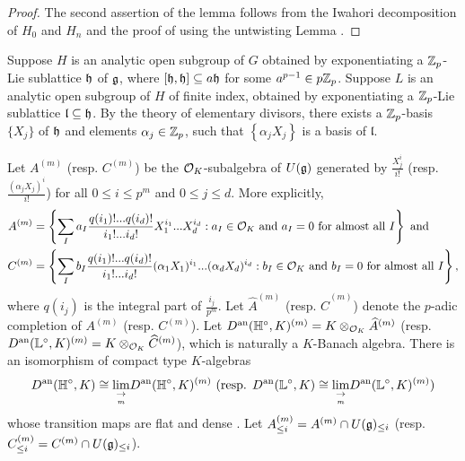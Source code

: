\documentclass[10pt]{amsart}
\begin{document}
\begin{proof}
The second assertion of the lemma follows from the Iwahori decomposition of $H_{0}$ and $H_{n}$ and the proof of \cite[Prop. 4.2.22]{Jacquet1} using the untwisting Lemma \cite[Lem. 3.6.4]{analytic}. 
\end{proof}

Suppose $H$ is an analytic open subgroup of $G$ obtained by exponentiating a $\mathbb{Z}_{p}$-Lie sublattice $\mathfrak{h}$ of $\mathfrak{g}$, where $\left[\mathfrak{h},\mathfrak{h}\right]\subseteq a\mathfrak{h}$ for some $a^{p-1}\in p\mathbb{Z}_{p}$. Suppose $L$ is an analytic open subgroup of $H$ of finite index, obtained by exponentiating a $\mathbb{Z}_{p}$-Lie sublattice $\mathfrak{l}\subseteq\mathfrak{h}$. By the theory of elementary divisors, there exists a $\mathbb{Z}_{p}$-basis $\{X_{j}\}$ of $\mathfrak{h}$ and elements $\alpha_{j}\in \mathbb{Z}_{p}$, such that $\left\{ \alpha_{j}X_{j}\right\}$  is a basis of $\mathfrak{l}$. 

Let $A^{(m)}$ (resp. $C^{(m)}$) be the $\mathcal{O}_{K}$-subalgebra of $U(\mathfrak{g})$ generated by $\frac{X_{j}^{i}}{i!}$ (resp. $\frac{(\alpha_{j}X_{j})^{i}}{i!}$) for all $0\leq i\leq p^{m}$ and $0\leq j \leq d$. More explicitly,  \begin{equation}\label{eqn:A^(m)}
    \begin{split}
        A^{(m)}& = \left\{ \sum_{I} a_{I} \frac{q(i_{1})!...q(i_{d})!}{i_{1}!...i_{d}!}X_{1}^{i_{1}}...X_{d}^{i_{d}}: a_{I}\in \mathcal{O}_{K} \textnormal{ and } a_{I}=0\textnormal{ for almost all }I\right\} \textnormal{ and}\\
        C^{(m)}& = \left\{ \sum_{I} b_{I} \frac{q(i_{1})!...q(i_{d})!}{i_{1}!...i_{d}!}(\alpha_{1}X_{1})^{i_{1}}...(\alpha_{d}X_{d})^{i_{d}}: b_{I}\in \mathcal{O}_{K} \textnormal{ and } b_{I}=0\textnormal{ for almost all }I\right\},
    \end{split}
\end{equation} where $q(i_j)$ is the integral part of $\frac{i_{j}}{p^m}$. Let $\widehat{A}^{(m)}$ (resp. $\widehat{C}^{(m)}$) denote the $p$-adic completion of $A^{(m)}$ (resp. $C^{(m)}$). Let $D^{\textnormal{an}}(\mathbb{H}^{\circ},K)^{(m)}= K\otimes_{\mathcal{O}_{K}}\widehat{A}^{(m)}$ (resp. $D^{\textnormal{an}}(\mathbb{L}^{\circ},K)^{(m)}= K\otimes_{\mathcal{O}_{K}}\widehat{C}^{(m)}$), which is naturally a $K$-Banach algebra. There is an isomorphism of compact type $K$-algebras \begin{equation}\label{eqn: D^(m)}
    D^{\textnormal{an}}(\mathbb{H}^{\circ},K)\cong \underset{\underset{m}{\rightarrow}}{\lim}D^{\textnormal{an}}(\mathbb{H}^{\circ},K)^{(m)} \textnormal{ (resp. } D^{\textnormal{an}}(\mathbb{L}^{\circ},K)\cong \underset{\underset{m}{\rightarrow}}{\lim}D^{\textnormal{an}}(\mathbb{L}^{\circ},K)^{(m)} \textnormal{)}
\end{equation} whose transition maps are flat and dense \cite[Prop. 5.2.6, Prop. 5.3.11]{analytic}. Let $A_{\leq i}^{(m)}=A^{(m)}\cap U(\mathfrak{g})_{\leq i}$ (resp. $C_{\leq i}^{(m)}=C^{(m)}\cap U(\mathfrak{g})_{\leq i}$). 
\end{document}
